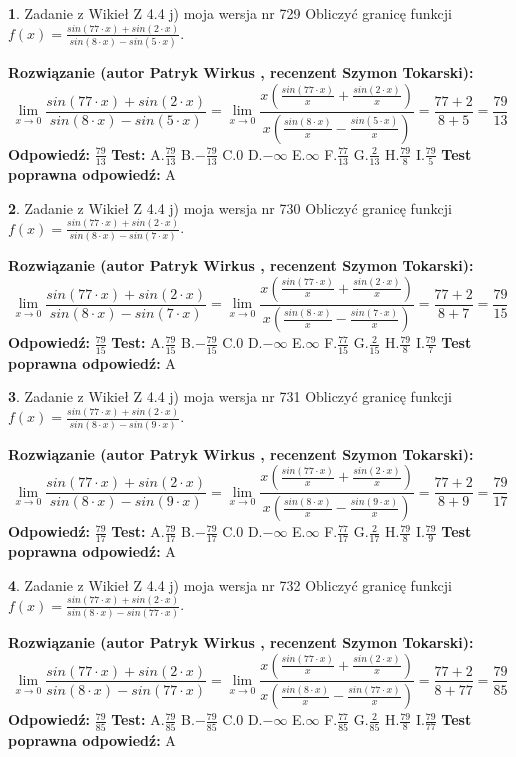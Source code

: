 \documentclass[12pt, a4paper]{article}
\theoremstyle{definition} %
\newtheorem{zad}{}
\newcommand{\zadStart}[1]{\begin{zad}#1\newline}
\newcommand{\zadStop}{\end{zad}}
\newcommand{\rozwStart}[2]{\noindent \textbf{Rozwiązanie (autor #1 , recenzent #2): }\newline}
\newcommand{\rozwStop}{\newline}
\newcommand{\odpStart}{\noindent \textbf{Odpowiedź:}\newline}
\newcommand{\odpStop}{\newline}
\newcommand{\testStart}{\noindent \textbf{Test:}\newline}
\newcommand{\testStop}{\newline}
\newcommand{\kluczStart}{\noindent \textbf{Test poprawna odpowiedź:}\newline}
\newcommand{\kluczStop}{\newline}
\begin{document}
\zadStart{Zadanie z Wikieł Z 4.4 j) moja wersja nr 729}
Obliczyć granicę funkcji $f(x)=\frac{sin(77\cdot x) +sin(2\cdot x)}{sin(8\cdot x) -sin(5\cdot x)}$.
\zadStop
\rozwStart{Patryk Wirkus}{Szymon Tokarski}
$$\lim\limits_{x\to 0}\frac{sin(77\cdot x) +sin(2\cdot x)}{sin(8\cdot x) -sin(5\cdot x)}=\lim\limits_{x\to 0}\frac{x(\frac{sin(77\cdot x)}{x}+\frac{sin(2\cdot x)}{x})}{x(\frac{sin(8\cdot x)}{x}-\frac{sin(5\cdot x)}{x})}=\frac{77+2}{8+5} = \frac{79}{13}$$
\rozwStop
\odpStart
$\frac{79}{13}$
\odpStop
\testStart
A.$\frac{79}{13}$
B.$-\frac{79}{13}$
C.$0$
D.$-\infty$
E.$\infty$
F.$\frac{77}{13}$
G.$\frac{2}{13}$
H.$\frac{79}{8}$
I.$\frac{79}{5}$
\testStop
\kluczStart
A
\kluczStop



\zadStart{Zadanie z Wikieł Z 4.4 j) moja wersja nr 730}
Obliczyć granicę funkcji $f(x)=\frac{sin(77\cdot x) +sin(2\cdot x)}{sin(8\cdot x) -sin(7\cdot x)}$.
\zadStop
\rozwStart{Patryk Wirkus}{Szymon Tokarski}
$$\lim\limits_{x\to 0}\frac{sin(77\cdot x) +sin(2\cdot x)}{sin(8\cdot x) -sin(7\cdot x)}=\lim\limits_{x\to 0}\frac{x(\frac{sin(77\cdot x)}{x}+\frac{sin(2\cdot x)}{x})}{x(\frac{sin(8\cdot x)}{x}-\frac{sin(7\cdot x)}{x})}=\frac{77+2}{8+7} = \frac{79}{15}$$
\rozwStop
\odpStart
$\frac{79}{15}$
\odpStop
\testStart
A.$\frac{79}{15}$
B.$-\frac{79}{15}$
C.$0$
D.$-\infty$
E.$\infty$
F.$\frac{77}{15}$
G.$\frac{2}{15}$
H.$\frac{79}{8}$
I.$\frac{79}{7}$
\testStop
\kluczStart
A
\kluczStop



\zadStart{Zadanie z Wikieł Z 4.4 j) moja wersja nr 731}
Obliczyć granicę funkcji $f(x)=\frac{sin(77\cdot x) +sin(2\cdot x)}{sin(8\cdot x) -sin(9\cdot x)}$.
\zadStop
\rozwStart{Patryk Wirkus}{Szymon Tokarski}
$$\lim\limits_{x\to 0}\frac{sin(77\cdot x) +sin(2\cdot x)}{sin(8\cdot x) -sin(9\cdot x)}=\lim\limits_{x\to 0}\frac{x(\frac{sin(77\cdot x)}{x}+\frac{sin(2\cdot x)}{x})}{x(\frac{sin(8\cdot x)}{x}-\frac{sin(9\cdot x)}{x})}=\frac{77+2}{8+9} = \frac{79}{17}$$
\rozwStop
\odpStart
$\frac{79}{17}$
\odpStop
\testStart
A.$\frac{79}{17}$
B.$-\frac{79}{17}$
C.$0$
D.$-\infty$
E.$\infty$
F.$\frac{77}{17}$
G.$\frac{2}{17}$
H.$\frac{79}{8}$
I.$\frac{79}{9}$
\testStop
\kluczStart
A
\kluczStop



\zadStart{Zadanie z Wikieł Z 4.4 j) moja wersja nr 732}
Obliczyć granicę funkcji $f(x)=\frac{sin(77\cdot x) +sin(2\cdot x)}{sin(8\cdot x) -sin(77\cdot x)}$.
\zadStop
\rozwStart{Patryk Wirkus}{Szymon Tokarski}
$$\lim\limits_{x\to 0}\frac{sin(77\cdot x) +sin(2\cdot x)}{sin(8\cdot x) -sin(77\cdot x)}=\lim\limits_{x\to 0}\frac{x(\frac{sin(77\cdot x)}{x}+\frac{sin(2\cdot x)}{x})}{x(\frac{sin(8\cdot x)}{x}-\frac{sin(77\cdot x)}{x})}=\frac{77+2}{8+77} = \frac{79}{85}$$
\rozwStop
\odpStart
$\frac{79}{85}$
\odpStop
\testStart
A.$\frac{79}{85}$
B.$-\frac{79}{85}$
C.$0$
D.$-\infty$
E.$\infty$
F.$\frac{77}{85}$
G.$\frac{2}{85}$
H.$\frac{79}{8}$
I.$\frac{79}{77}$
\testStop
\kluczStart
A
\kluczStop
\end{document}
